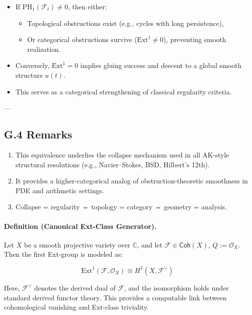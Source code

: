 \documentclass[11pt]{article}
\begin{document}
\begin{itemize}
  \item If $\mathrm{PH}_1(\mathcal{F}_t) \neq 0$, then either:
    \begin{itemize}
      \item Topological obstructions exist (e.g., cycles with long persistence),
      \item Or categorical obstructions survive ($\mathrm{Ext}^1 \neq 0$), preventing smooth realization.
    \end{itemize}
  \item Conversely, $\mathrm{Ext}^1 = 0$ implies gluing success and descent to a global smooth structure $u(t)$.
  \item This serves as a categorical strengthening of classical regularity criteria.
\end{itemize}

---

\subsection*{G.4 Remarks}

\begin{enumerate}
  \item This equivalence underlies the collapse mechanism used in all AK-style structural resolutions (e.g., Navier–Stokes, BSD, Hilbert's 12th).
  \item It provides a higher-categorical analog of obstruction-theoretic smoothness in PDE and arithmetic settings.
  \item Collapse = regularity ⇔ topology = category ⇔ geometry = analysis.
\end{enumerate}



\paragraph{Definition (Canonical Ext-Class Generator).}

Let \( X \) be a smooth projective variety over \( \mathbb{C} \), and let \( \mathcal{F} \in \mathsf{Coh}(X) \), \( Q := \mathcal{O}_X \).  
Then the first Ext-group is modeled as:

\[
\mathrm{Ext}^1(\mathcal{F}, \mathcal{O}_X) \cong H^1(X, \mathcal{F}^\vee)
\]

Here, \( \mathcal{F}^\vee \) denotes the derived dual of \( \mathcal{F} \), and the isomorphism holds under standard derived functor theory.  
This provides a computable link between cohomological vanishing and Ext-class triviality.
\end{document}
